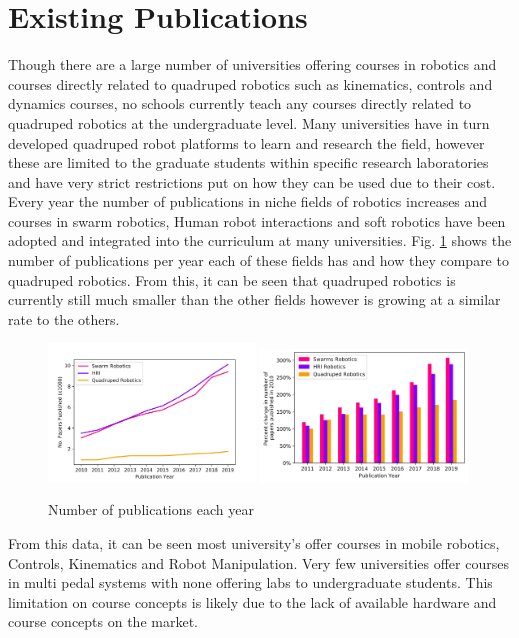 \documentclass[12pt]{report}
\begin{document}
\section{Existing Publications}
Though there are a large number of universities offering courses in robotics and courses directly related to quadruped robotics such as kinematics, controls and dynamics courses, no schools currently teach any courses directly related to quadruped robotics at the undergraduate level. Many universities have in turn developed quadruped robot platforms to learn and research the field, however these are limited to the graduate students within specific research laboratories and have very strict restrictions put on how they can be used due to their cost. Every year the number of publications in niche fields of robotics increases and courses in swarm robotics, Human robot interactions and soft robotics have been adopted and integrated into the curriculum at many universities. Fig. \ref{fig:comparison} shows the number of publications per year each of these fields has and how they compare to quadruped robotics. From this, it can be seen that quadruped robotics is currently still much smaller than the other fields however is growing at a similar rate to the others.
\begin{figure}[H]
    \centering
    \includegraphics[width=0.49\textwidth]{Images/NumPapersPublished.png}
    \includegraphics[width=0.49\textwidth]{Images/NumPapersPublishedDelta.png}
    \caption{Number of publications each year}
    \label{fig:comparison}
\end{figure}

From this data, it can be seen most university's offer courses in mobile robotics, Controls, Kinematics and Robot Manipulation. Very few universities offer courses in multi pedal systems with none offering labs to undergraduate students. This limitation on course concepts is likely due to the lack of available hardware and course concepts on the market. 
\end{document}
